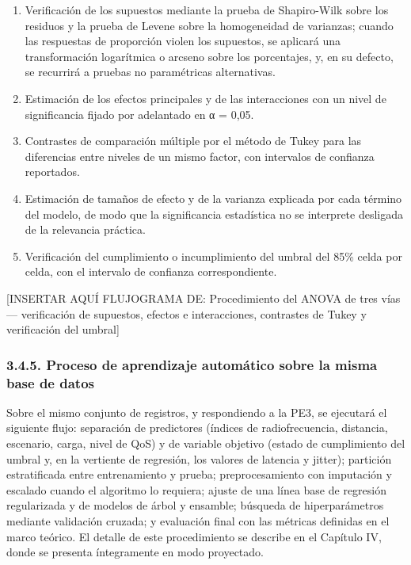 \documentclass[
  12pt,
]{article}
\providecommand{\tightlist}{%
  \setlength{\itemsep}{0pt}\setlength{\parskip}{0pt}}
\begin{document}
\begin{enumerate}
\def\labelenumi{\arabic{enumi}.}
\tightlist
\item
  Verificación de los supuestos mediante la prueba de Shapiro-Wilk sobre
  los residuos y la prueba de Levene sobre la homogeneidad de varianzas;
  cuando las respuestas de proporción violen los supuestos, se aplicará
  una transformación logarítmica o arcseno sobre los porcentajes, y, en
  su defecto, se recurrirá a pruebas no paramétricas alternativas.
\item
  Estimación de los efectos principales y de las interacciones con un
  nivel de significancia fijado por adelantado en α = 0,05.
\item
  Contrastes de comparación múltiple por el método de Tukey para las
  diferencias entre niveles de un mismo factor, con intervalos de
  confianza reportados.
\item
  Estimación de tamaños de efecto y de la varianza explicada por cada
  término del modelo, de modo que la significancia estadística no se
  interprete desligada de la relevancia práctica.
\item
  Verificación del cumplimiento o incumplimiento del umbral del 85\%
  celda por celda, con el intervalo de confianza correspondiente.
\end{enumerate}

{[}INSERTAR AQUÍ FLUJOGRAMA DE: Procedimiento del ANOVA de tres vías —
verificación de supuestos, efectos e interacciones, contrastes de Tukey
y verificación del umbral{]}

\subsubsection{3.4.5. Proceso de aprendizaje automático sobre la misma
base de
datos}\label{proceso-de-aprendizaje-automuxe1tico-sobre-la-misma-base-de-datos}

Sobre el mismo conjunto de registros, y respondiendo a la PE3, se
ejecutará el siguiente flujo: separación de predictores (índices de
radiofrecuencia, distancia, escenario, carga, nivel de QoS) y de
variable objetivo (estado de cumplimiento del umbral y, en la vertiente
de regresión, los valores de latencia y jitter); partición estratificada
entre entrenamiento y prueba; preprocesamiento con imputación y escalado
cuando el algoritmo lo requiera; ajuste de una línea base de regresión
regularizada y de modelos de árbol y ensamble; búsqueda de
hiperparámetros mediante validación cruzada; y evaluación final con las
métricas definidas en el marco teórico. El detalle de este procedimiento
se describe en el Capítulo IV, donde se presenta íntegramente en modo
proyectado.
\end{document}

